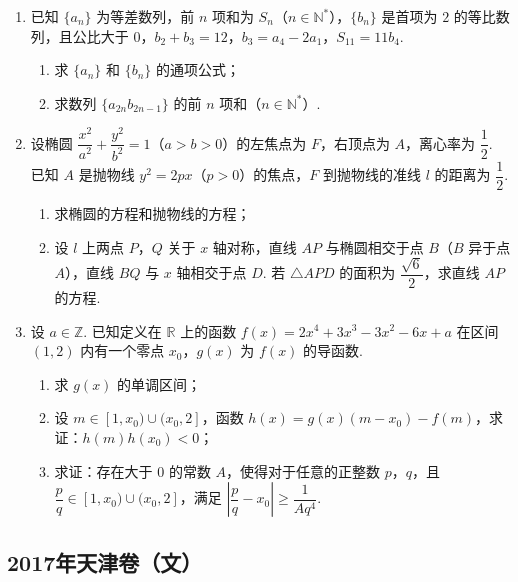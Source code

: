 \begin{description}
\begin{enumerate}[leftmargin=5pt]
        \item 已知 \(\{a_n\}\) 为等差数列，前 \(n\) 项和为 \(S_n\)（\(n\in\mathbb{N}^*\)），\(\{b_n\}\) 是首项为 \(2\) 的等比数列，且公比大于 \(0\)，\(b_2+b_3=12\)，\(b_3=a_4-2a_1\)，\(S_{11}=11b_4\).

\begin{enumerate}
\item 求 \(\{a_n\}\) 和 \(\{b_n\}\) 的通项公式；
\item 求数列 \(\{a_{2n}b_{2n-1}\}\) 的前 \(n\) 项和（\(n\in\mathbb{N}^*\)）.
\end{enumerate}

        \item 设椭圆 \(\dfrac{x^2}{a^2}+\dfrac{y^2}{b^2}=1\)（\(a>b>0\)）的左焦点为 \(F\)，右顶点为 \(A\)，离心率为 \(\dfrac{1}{2}\). 已知 \(A\) 是抛物线 \(y^2=2px\)（\(p>0\)）的焦点，\(F\) 到抛物线的准线 \(l\) 的距离为 \(\dfrac{1}{2}\).

\begin{enumerate}
\item 求椭圆的方程和抛物线的方程；
\item 设 \(l\) 上两点 \(P\)，\(Q\) 关于 \(x\) 轴对称，直线 \(AP\) 与椭圆相交于点 \(B\)（\(B\) 异于点 \(A\)），直线 \(BQ\) 与 \(x\) 轴相交于点 \(D\). 若 \(\triangle APD\) 的面积为 \(\dfrac{\sqrt{6}}{2}\)，求直线 \(AP\) 的方程.
\end{enumerate}

        \item 设 \(a\in\mathbb{Z}\). 已知定义在 \(\mathbb{R}\) 上的函数 \(f(x)=2x^4+3x^3-3x^2-6x+a\) 在区间 \((1,2)\) 内有一个零点 \(x_0\)，\(g(x)\) 为 \(f(x)\) 的导函数.

\begin{enumerate}
\item 求 \(g(x)\) 的单调区间；
\item 设 \(m\in[1,x_0)\cup(x_0,2]\)，函数 \(h(x)=g(x)(m-x_0)-f(m)\)，求证：\(h(m)h(x_0)<0\)；
\item 求证：存在大于 \(0\) 的常数 \(A\)，使得对于任意的正整数 \(p\)，\(q\)，且 \(\dfrac{p}{q}\in[1,x_0)\cup(x_0,2]\)，满足 \(\left|\dfrac{p}{q}-x_0\right|\ge \dfrac{1}{Aq^4}\).
\end{enumerate}

    \end{enumerate}

\end{description}


\subsection{2017年天津卷（文）}\label{gk:2017年天津卷（文）}

